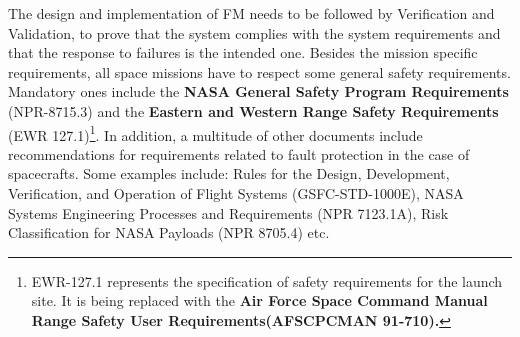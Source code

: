 The design and implementation of FM needs to be followed by Verification and
Validation, to prove that the system complies with the system requirements and
that the response to failures is the intended one. Besides the mission specific
requirements, all space missions have to respect some general safety
requirements. Mandatory ones include the \textbf{NASA General Safety Program
Requirements} (NPR-8715.3) and the \textbf{Eastern and Western Range Safety
Requirements} (EWR 127.1)\footnote{EWR-127.1 represents the specification of
safety requirements for the launch site. It is being replaced with the
\textbf{Air Force Space Command Manual Range Safety User Requirements(AFSCPCMAN
91-710).}}\cite{surv-nasa-mars}. In addition, a multitude of other documents
include recommendations for requirements related to fault protection in the case
of spacecrafts. Some examples include: Rules for the Design, Development,
Verification, and Operation of Flight Systems (GSFC-STD-1000E), NASA Systems
Engineering Processes and Requirements (NPR 7123.1A), Risk Classification for
NASA Payloads (NPR 8705.4) etc.
